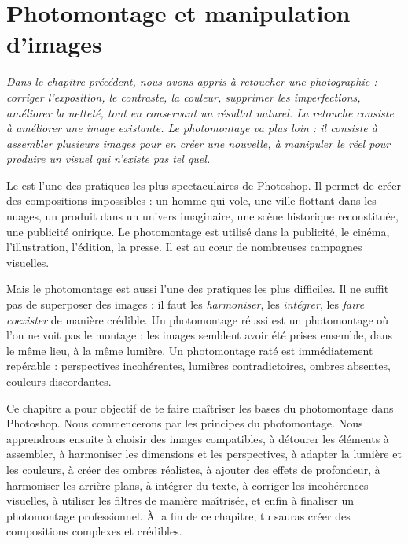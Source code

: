 
\chapter{Photomontage et manipulation d'images}

\noindent
\textit{Dans le chapitre précédent, nous avons appris à retoucher une photographie : corriger l'exposition, le contraste, la couleur, supprimer les imperfections, améliorer la netteté, tout en conservant un résultat naturel. La retouche consiste à améliorer une image existante. Le photomontage va plus loin : il consiste à \emph{assembler} plusieurs images pour en créer une nouvelle, à \emph{manipuler} le réel pour produire un visuel qui n'existe pas tel quel.}

\vspace{1em}

\noindent
Le  est l'une des pratiques les plus spectaculaires de Photoshop. Il permet de créer des compositions impossibles : un homme qui vole, une ville flottant dans les nuages, un produit dans un univers imaginaire, une scène historique reconstituée, une publicité onirique. Le photomontage est utilisé dans la publicité, le cinéma, l'illustration, l'édition, la presse. Il est au cœur de nombreuses campagnes visuelles.

\vspace{1em}

\noindent
Mais le photomontage est aussi l'une des pratiques les plus difficiles. Il ne suffit pas de superposer des images : il faut les \emph{harmoniser}, les \emph{intégrer}, les \emph{faire coexister} de manière crédible. Un photomontage réussi est un photomontage où l'on ne voit pas le montage : les images semblent avoir été prises ensemble, dans le même lieu, à la même lumière. Un photomontage raté est immédiatement repérable : perspectives incohérentes, lumières contradictoires, ombres absentes, couleurs discordantes.

\vspace{1em}

\noindent
Ce chapitre a pour objectif de te faire maîtriser les bases du photomontage dans Photoshop. Nous commencerons par les principes du photomontage. Nous apprendrons ensuite à choisir des images compatibles, à détourer les éléments à assembler, à harmoniser les dimensions et les perspectives, à adapter la lumière et les couleurs, à créer des ombres réalistes, à ajouter des effets de profondeur, à harmoniser les arrière-plans, à intégrer du texte, à corriger les incohérences visuelles, à utiliser les filtres de manière maîtrisée, et enfin à finaliser un photomontage professionnel. À la fin de ce chapitre, tu sauras créer des compositions complexes et crédibles.

